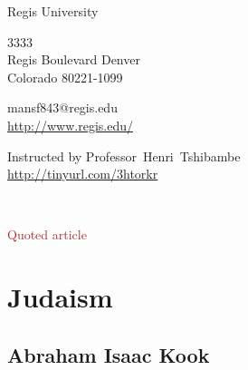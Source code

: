 \documentclass[11pt,a4paper]{scrartcl} %
\begin{document}
\pagecolor{Gray!20!Bittersweet!10}
\begin{cv}{}
        \begin{cvlist}{\textcolor{brown}{}}\label{PersDat}  
            \item   Regis University
            \item   3333\\
                    Regis Boulevard Denver \\	
                    Colorado 80221-1099
            \item   mansf843@regis.edu\\				
                    \url{http://www.regis.edu/}				
        \end{cvlist}
        \begin{cvlist}{}\label{irgendwas}
            \item Instructed by Professor~Henri~Tshibambe\\
             \url{http://tinyurl.com/3htorkr}
        \end{cvlist}
    \end{cv}
\clearpage

\noindent
\textcolor{Maroon}{}\\
\textcolor{brown}{}
\begin{verse}

\end{verse}
\textcolor{brown}{Quoted article}~\cite{key here}
\clearpage
\title{\textcolor{Maroon}{\rmfamily\normalfont{}}}
    \author{\textcolor{brown}{}}
    \date{} %
    
    \maketitle
    
    \begin{abstract}
  
    \end{abstract}
       
    \tableofcontents
    
    \section{Judaism}
    \subsection{Abraham Isaac Kook}
\end{document}
